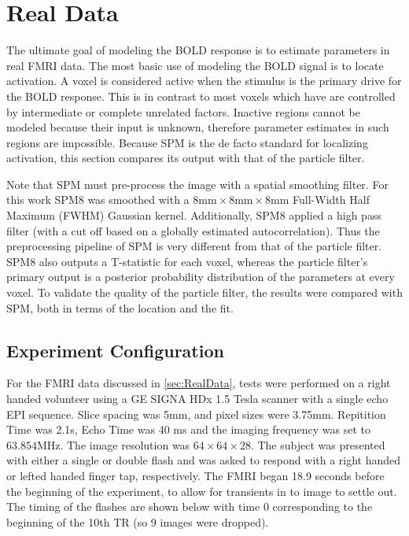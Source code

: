 \chapter{Real Data}
\label{sec:RealData}
The ultimate goal of modeling the BOLD response is to estimate parameters
in real FMRI data. The most basic use of modeling the BOLD signal is to
locate activation. A voxel is considered active when the stimulus 
is the primary drive for the BOLD response. This is in contrast to 
most voxels which have are controlled by intermediate or complete unrelated factors. 
Inactive regions cannot be modeled because their input is unknown, therefore
parameter estimates in such regions are impossible. 
Because SPM is the de facto standard for localizing activation,
this section compares its output with that of the particle filter.

Note that SPM must pre-process the image with a spatial smoothing 
filter. For this work SPM8 was smoothed with a
$8\text{mm} \times  8\text{mm} \times 8\text{mm}$ Full-Width Half Maximum
(FWHM) Gaussian kernel. 
Additionally, SPM8 applied a high pass filter (with a cut
off based on a globally estimated autocorrelation). Thus the preprocessing pipeline
of SPM is very different from that of the particle filter. SPM8 also outputs
a T-statistic for each voxel, whereas the 
particle filter's primary output is a posterior probability distribution of the parameters
at every voxel. To validate the quality of the particle filter, the results 
were compared with SPM, both in terms of the location and the fit.

\section{Experiment Configuration}
\label{sec:ExperimentConfig}
For the FMRI data discussed in \autoref{sec:RealData}, tests were 
performed on a right handed volunteer using a GE SIGNA HDx 1.5 Tesla
scanner with a single echo EPI sequence. Slice spacing was
5mm, and pixel sizes were 3.75mm.  Repitition Time was 2.1s, 
Echo Time was 40 ms and the imaging frequency was set to $63.854$MHz.
The image resolution was $64 \times 64 \times 28$. 
The subject was presented with either a single or
double flash and was asked to respond with a right handed
or lefted handed finger tap, respectively. The FMRI began 18.9 seconds
before the beginning of the experiment, to allow for transients 
in to image to settle out. The timing of the flashes are shown 
below with time 0 corresponding to the beginning of
the 10th TR (so 9 images were dropped). 

